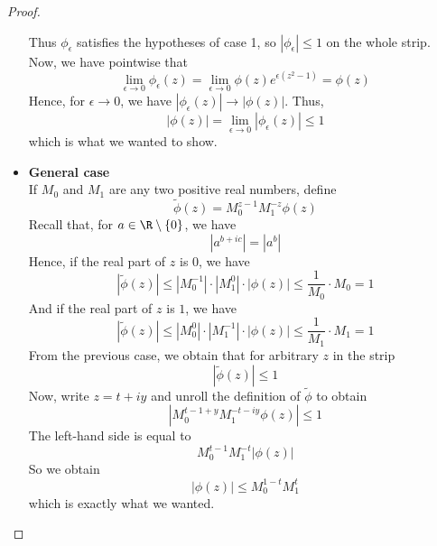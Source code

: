 \begin{proof}
\begin{itemize}
{        Thus $\phi_{\epsilon}$ satisfies the hypotheses of case 1, so $|\phi_{\epsilon}| \leq 1$ on the whole strip.\\
        Now, we have pointwise that
        \[\lim_{\epsilon \to 0} \phi_{\epsilon}(z) = \lim_{\epsilon \to 0} \phi(z) e^{\epsilon(z^2-1)} = \phi(z)\]
        Hence, for $\epsilon \to 0$, we have $|\phi_{\epsilon}(z)| \to |\phi(z)|$.
        Thus,
        \[ |\phi(z)| = \lim_{\epsilon \to 0} |\phi_{\epsilon}(z)| \leq 1 \]
        which is what we wanted to show.
        }
        \item{ \textbf{General case}\\
        If $M_0$ and $M_1$ are any two positive real numbers, define
        \[ \tilde{\phi} (z) = M_0 ^{z-1} M_1^{-z} \phi(z) \]
        Recall that, for $a\in \R\setminus\{0\}$, we have
        \[ |a^{b+ic}| = |a^b| \]
        Hence, if the real part of $z$ is $0$, we have
        \[ |\tilde{\phi} (z)| \leq |M_0^{-1}| \cdot |M_1^0| \cdot |\phi(z)| \leq \frac{1}{M_0} \cdot M_0 = 1 \]
        And if the real part of $z$ is $1$, we have
        \[ |\tilde{\phi} (z)| \leq |M_0^0| \cdot |M_1^{-1}| \cdot |\phi(z)| \leq \frac{1}{M_1} \cdot M_1 = 1 \]
        From the previous case, we obtain that for arbitrary $z$ in the strip
        \[ |\tilde{\phi} (z)| \leq 1 \]
        Now, write $z= t + iy$ and unroll the definition of $\tilde{\phi}$ to obtain
        \[ |M_0^{t-1+y} M_1^{-t-iy} \phi(z)| \leq 1 \]
        The left-hand side is equal to
        \[ M_0^{t-1} M_1^{-t} |\phi(z)| \]
        So we obtain
        \[|\phi(z)| \leq M_0^{1-t} M_1^t\]
        which is exactly what we wanted.
        }
    \end{itemize}
\end{proof}


